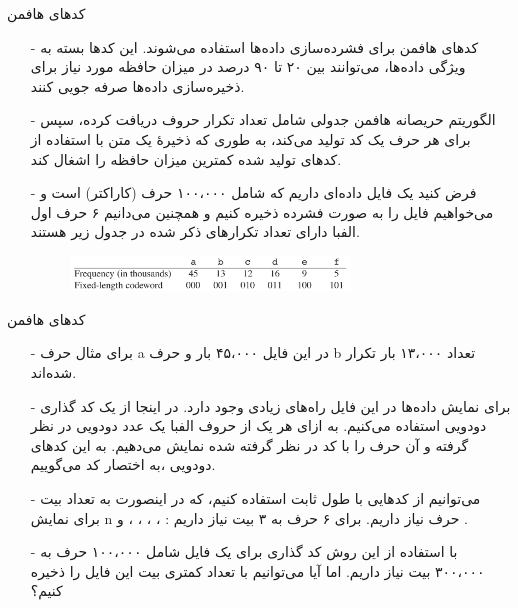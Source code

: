 
\begin{frame}{‌کدهای هافمن}
\begin{itemize}\itemr
\item[-]
کدهای هافمن
برای فشرده‌سازی داده‌ها استفاده می‌شوند. این کدها بسته به ویژگی داده‌ها، می‌توانند بین ۲۰ تا ۹۰ درصد در میزان حافظه مورد نیاز برای ذخیره‌سازی داده‌ها صرفه جویی کنند.
\item[-]
 الگوریتم حریصانه هافمن جدولی شامل تعداد تکرار حروف دریافت کرده، سپس برای هر حرف یک کد تولید می‌کند، به طوری که ذخیرهٔ یک متن با استفاده از کدهای تولید شده کمترین میزان حافظه را اشغال کند.
\item[-]
فرض کنید یک فایل داده‌ای داریم که شامل
۱۰۰،۰۰۰
حرف (کاراکتر) است و می‌خواهیم فایل را به صورت فشرده ذخیره کنیم و همچنین می‌دانیم ۶ حرف اول الفبا دارای تعداد تکرارهای ذکر شده در جدول زیر هستند.
\begin{figure}
\includegraphics[width=0.7\textwidth]{figs/chap05/huffman-example}
\end{figure}
\end{itemize}
\end{frame}


\begin{frame}{‌کدهای هافمن}
\begin{itemize}\itemr
\item[-]
برای مثال حرف a در این فایل
۴۵،۰۰۰
بار و حرف b تعداد
۱۳،۰۰۰
بار تکرار شده‌اند.
\item[-]
برای نمایش داده‌ها در این فایل راه‌های زیادی وجود دارد. در اینجا از یک کد گذاری دودویی استفاده می‌کنیم. به ازای هر یک از حروف الفبا یک عدد دودویی در نظر گرفته و آن حرف را با کد در نظر گرفته شده نمایش می‌دهیم. به این کدهای دودویی
،به اختصار کد می‌گوییم.
\item[-]
می‌توانیم از کدهایی با طول ثابت
استفاده کنیم، که در اینصورت به تعداد
بیت برای نمایش n حرف نیاز داریم. برای ۶ حرف به ۳ بیت نیاز داریم :
،
،
،
،
و
.
\item[-]
با استفاده از این روش کد گذاری برای یک فایل شامل
۱۰۰،۰۰۰
حرف به
۳۰۰،۰۰۰
بیت نیاز داریم. اما آیا می‌توانیم با تعداد کمتری بیت این فایل را ذخیره کنیم؟
\end{itemize}
\end{frame}


